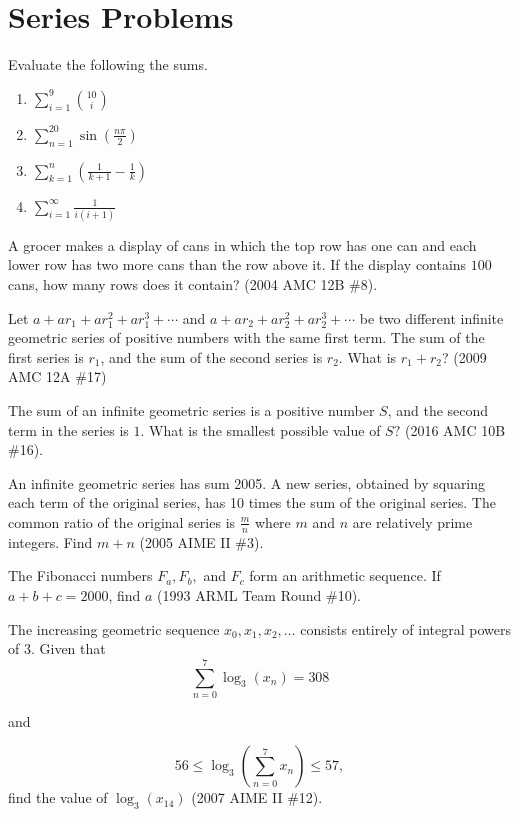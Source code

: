\documentclass[11pt]{article}
\begin{document}
\section*{Series Problems}
\begin{problem}[5]
    Evaluate the following the sums.
    \begin{enumerate}
		\item $\sum\limits_{i=1}^{9} {\binom{10}{i}}$
		\item $\sum\limits_{n=1}^{20} \sin(\frac{n\pi}{2})$
		\item $\sum\limits_{k=1}^n (\frac{1}{k+1}-\frac{1}{k})$
		\item $\sum\limits_{i=1}^{\infty} \frac{1}{i(i+1)}$
	\end{enumerate}
\end{problem}
\begin{problem}[10]
    A grocer makes a display of cans in which the top row has one can and each lower row has two more cans than the row above it. If the display contains $100$ cans, how many rows does it contain? (2004 AMC 12B \#8).
\end{problem}
\begin{problem}[20]
    Let $a + ar_1 + ar_1^2 + ar_1^3 + \cdots$ and $a + ar_2 + ar_2^2 + ar_2^3 + \cdots$ be two different infinite geometric series of positive numbers with the same first term. The sum of the first series is $r_1$, and the sum of the second series is $r_2$. What is $r_1 + r_2$? (2009 AMC 12A \#17)
\end{problem}
\begin{problem}[20]
    The sum of an infinite geometric series is a positive number $S$, and the second term in the series is $1$. What is the smallest possible value of $S?$ (2016 AMC 10B \#16).
\end{problem}
\begin{problem}[20]
    An infinite geometric series has sum 2005. A new series, obtained by squaring each term of the original series, has 10 times the sum of the original series. The common ratio of the original series is $\frac{m}{n}$ where $m$ and $n$ are relatively prime integers. Find $m+n$ (2005 AIME II \#3).
\end{problem}
\begin{problem}[25]
    The Fibonacci numbers $F_a, F_b,$ and $F_c$ form an arithmetic sequence. If $a + b + c = 2000$, find $a$ (1993 ARML Team Round \#10).
\end{problem}
\begin{problem}[35]
    The increasing geometric sequence $x_{0},x_{1},x_{2},\ldots$ consists entirely of integral powers of $3.$ Given that \[\sum_{n=0}^{7}\log_{3}(x_{n}) = 308\]
    {\centering and\par}
    \[56 \leq \log_{3}\left ( \sum_{n=0}^{7}x_{n}\right ) \leq 57,\]
    find the value of $\log_{3}(x_{14})$ (2007 AIME II \#12).
\end{problem}
\end{document}
